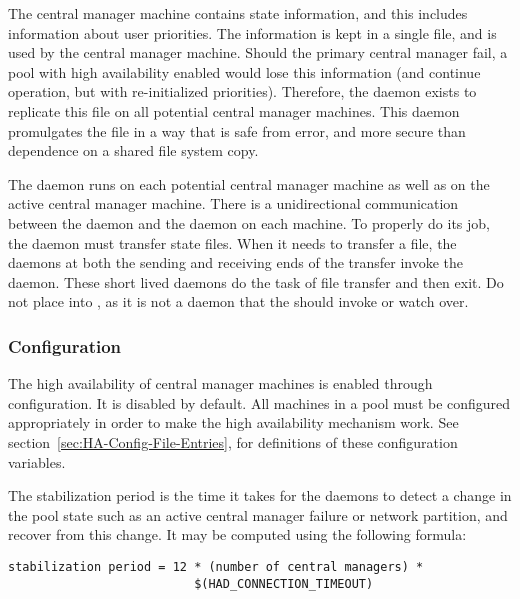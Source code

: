The central manager machine contains state information,
and this includes information about user priorities.
The information is kept in a single file, 
and is used by the central manager machine.
Should the primary central manager fail,
a pool with high availability enabled would lose this information
(and continue operation, but with re-initialized priorities). 
Therefore, the  daemon exists
to replicate this file on all potential central manager machines.
This daemon promulgates the file in a way that is safe from error,
and more secure than dependence on a shared file system copy.

The  daemon runs on each
potential central manager machine as well as on
the active central manager machine.
There is a unidirectional communication between the 
daemon and the  daemon on each machine.
To properly do its job, the  daemon must
transfer state files.
When it needs to transfer a file,
the  daemons at both the sending and receiving
ends of the transfer invoke the  daemon.
These short lived daemons do the task of file transfer and then exit.
Do not place  into ,
as it is not a daemon that the  should invoke or
watch over.

\subsubsection{\label{sec:HA-configuration} Configuration} 

The high availability of central manager machines is
enabled through configuration.
It is disabled by default.
All machines in a pool must be configured appropriately
in order to make the high availability mechanism work.
See
section~\ref{sec:HA-Config-File-Entries},
for definitions of these configuration variables.

The stabilization period is the time it takes for the 
 daemons
to detect a change in the pool state such as
an active central manager failure
or network partition, and recover from this change.
It may be computed using the following formula:
\footnotesize
\begin{verbatim}
stabilization period = 12 * (number of central managers) *
                          $(HAD_CONNECTION_TIMEOUT)
\end{verbatim}
\normalsize


